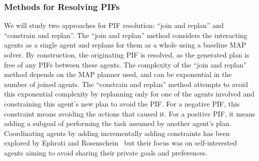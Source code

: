 \documentclass[11pt]{article}
\begin{document}
\subsubsection{Methods for Resolving PIFs}
\label{sec:methodsForResolving}
We will study two approaches for PIF resolution:  ``join and replan'' and ``constrain and replan''. 
The ``join and replan'' method considers the interacting agents as a single agent and replans for them as a whole using a baseline MAP solver. By construction, the originating PIF is resolved, as the generated plan is free of any PIFs between these agents. The complexity of the ``join and replan'' method depends on the MAP planner used, and can be exponential in the number of joined agents. 
The ``constrain and replan'' method attempts to avoid this exponential complexity by replanning only for one of the agents involved and constraining this agent's new plan to avoid the PIF. For a negative PIF, this constraint means avoiding the actions that caused it. For a positive PIF, it  means adding a subgoal of performing the task assumed by another agent's plan. 
Coordinating agents by adding incrementally adding constraints has been explored by Ephrati and Rosenschein~\cite{ephrati1993multi} but their focus was on self-interested agents aiming to avoid sharing their private goals and preferences. %


\end{document}
